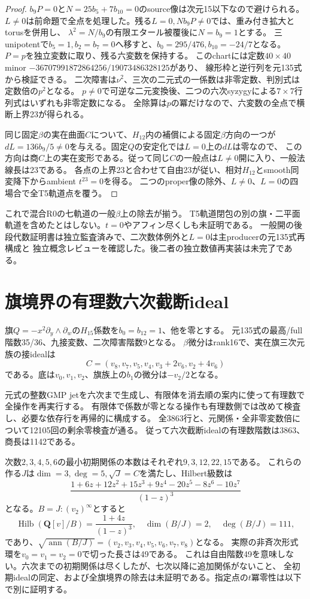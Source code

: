 \documentclass[11pt,a4paper]{ltjsarticle}
\newcommand{\QQ}{\mathbf Q}
\theoremstyle{remark}
\begin{document}
\begin{proof}
$b_9P=0$と$N=25b_5+7b_{10}=0$のsource像は次元15以下なので避けられる。
$L\ne0$は前命題で全点を処理した。残る$L=0,Nb_9P\ne0$では、重み付き拡大とtorusを併用し、
$\lambda^2=N/b_9$の有限エタール被覆後に$N=b_9=1$とする。
三unipotentで$b_5=1,b_2=b_7=0$へ移すと、$b_0=295/476,b_{10}=-24/7$となる。
$P=p$を独立変数に取り、残る六変数を保持する。
このchartには定数$40\times40$ minor $-36707991872864256/19073486328125$があり、
線形枠と逆行列を元135式から検証できる。
二次障害は$\nu^2$、三次の二元式の一係数は非零定数、判別式は定数倍の$p^2$となる。
$p\ne0$で可逆な二元変換後、二つの六次syzygyによる$7\times7$行列式はいずれも非零定数になる。
全除算は$p$の冪だけなので、六変数の全点で横断上界23が得られる。

同じ固定$\beta$の実在曲面$C$について、$H_{12}$内の補償による固定$\beta$方向の一つが
$dL=136b_9/5\ne0$を与える。固定$Q$の安定化では$L=0$上の$dL$は零なので、
この方向は商$C$上の実在変形である。従って同じ$C$の一般点は$L\ne0$開に入り、一般法線長は23である。
各点の上界23と合わせて自由23が従い、相対$H_{12}$とsmooth同変降下からambient $t^{23}=0$を得る。
二つのproper像の除外、$L\ne0$、$L=0$の四場合で全T5軌道点を覆う\cite{t5-full-v44}。
\end{proof}
これで混合R0の七軌道の一般$\beta$上の除去が揃う。
T5軌道閉包の別の旗・二平面軌道を含めたとはしない。$t=0$やアフィン尽くしも未証明である。
一般開の後段代数証明書は独立監査済みで、二次数体例外と$L=0$は主producerの元135式再構成と
独立概念レビューを確認した。後二者の独立数値再実装は未完了である。

\section{旗境界の有理数六次截断ideal}
旗$Q=-x^2\partial_y\wedge\partial_w$の$H_{15}$係数を$b_0=b_{12}=1$、他を零とする。
元135式の最高/full階数35/36、九接変数、二次障害階数9となる。
$\beta$微分はrank16で、実在旗三次元族の接idealは
\[
 C=(v_8,v_7,v_5,v_4,v_3+2v_6,v_2+4v_6)
\]
である。底は$v_0,v_1,v_2$、旗族上の$b_1$の微分は$-v_2/2$となる。

元式の整数GMP jetを六次まで生成し、有限体を消去順の案内に使って有理数で全操作を再実行する。
有限体で係数が零となる操作も有理数側では改めて検査し、必要な依存行を再帰的に構成する。
全3863行と、元関係・全非零変数倍について12105回の剰余零検査が通る。
従って六次截断idealの有理数階数は3863、商長は1142である。

次数$2,3,4,5,6$の最小初期関係の本数はそれぞれ$9,3,12,22,15$である。
これらの作る$J$は$\dim=3,\deg=5,\sqrt J=C$を満たし、Hilbert級数は
\[
 \frac{1+6z+12z^2+15z^3+9z^4-20z^5-8z^6-10z^7}{(1-z)^3}
\]
となる。$B=J:(v_2)^\infty$とすると
\[
 \operatorname{Hilb}(\QQ[v]/B)=\frac{1+4z}{(1-z)^3},\quad
 \dim(B/J)=2,\quad\deg(B/J)=111,
\]
であり、$\sqrt{\operatorname{ann}(B/J)}=(v_2,v_3,v_4,v_5,v_6,v_7,v_8)$となる。
実際の非斉次形式環を$v_0=v_1=v_2=0$で切った長さは49である\cite{flag-rational-v44}。
これは自由階数49を意味しない。六次までの初期関係は尽くしたが、七次以降に追加関係がないこと、
全初期idealの同定、および全旗境界の除去は未証明である。指定点の$t$冪零性は以下で別に証明する。
\end{document}
